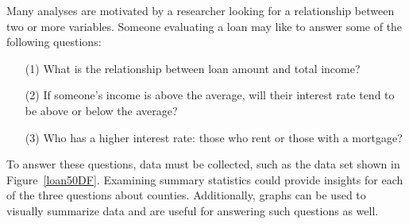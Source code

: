 Many analyses are motivated by a researcher looking for
a relationship between two or more variables.
Someone evaluating a loan may like to answer
some of the following questions:
\begin{enumerate}
\setlength{\itemsep}{0mm}
\item[(1)]\label{loan_size_vs_total_income}
    What is the relationship between loan amount and total income?
\item[(2)]\label{interest_rate_vs_income}
    If someone's income is above the average, will their
    interest rate tend to be above or below the average?
\item[(3)]\label{interest_rate_vs_rent-mortgage_question}
    Who has a higher interest rate: those who rent
    or those with a mortgage?
\end{enumerate}

To answer these questions, data must be collected, such as
the  data set shown in Figure~\ref{loan50DF}.
Examining summary statistics  could
provide insights for each of the three questions about counties.
Additionally, graphs can be used to visually summarize data
and are useful for answering such questions as well.


